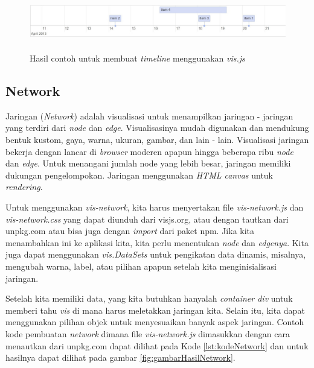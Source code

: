 \begin{figure}[H]
    \centering
    \includegraphics[width=16.5cm, height=2.5cm]{Gambar/hasilTimeline.jpg}
    \caption{Hasil contoh untuk membuat \textit{timeline} menggunakan \textit{vis.js}}
    \label{fig:gambarHasilTimeline}
\end{figure}

\newpage
\subsection{Network}
Jaringan (\textit{Network}) adalah visualisasi untuk menampilkan jaringan - jaringan yang terdiri dari \textit{node} dan \textit{edge}. Visualisasinya mudah digunakan dan mendukung bentuk kustom, gaya, warna, ukuran, gambar, dan lain - lain. Visualisasi jaringan bekerja dengan lancar di \textit{browser} moderen apapun hingga beberapa ribu \textit{node} dan \textit{edge}. Untuk menangani jumlah node yang lebih besar, jaringan memiliki dukungan pengelompokan. Jaringan menggunakan \textit{HTML canvas} untuk \textit{rendering}.

Untuk menggunakan \textit{vis-network}, kita harus menyertakan file \textit{vis-network.js} dan \textit{vis-network.css} yang dapat diunduh dari visjs.org, atau dengan tautkan dari unpkg.com atau bisa juga dengan \textit{import} dari paket npm. Jika kita menambahkan ini ke aplikasi kita, kita perlu menentukan \textit{node} dan \textit{edgenya}. Kita juga dapat menggunakan \textit{vis.DataSets} untuk pengikatan data dinamis, misalnya, mengubah warna, label, atau pilihan apapun setelah kita menginisialisasi jaringan.

Setelah kita memiliki data, yang kita butuhkan hanyalah \textit{container div} untuk memberi tahu \textit{vis} di mana harus meletakkan jaringan kita. Selain itu, kita dapat menggunakan pilihan objek untuk menyesuaikan banyak aspek jaringan. Contoh kode pembuatan \textit{network}  dimana file \textit{vis-network.js} dimasukkan dengan cara menautkan dari unpkg.com dapat dilihat pada Kode \ref{lst:kodeNetwork} dan untuk hasilnya dapat dilihat pada gambar \ref{fig:gambarHasilNetwork}.

